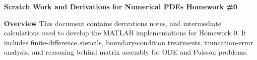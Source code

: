 \documentclass[11pt]{article}
\begin{document}
\begin{center}
    \textbf{Scratch Work and Derivations for Numerical PDEs Homework \#0}
\end{center}
\textbf{Overview} This document contains derivations notes, and intermediate calculations used to develop the MATLAB implementations for Homework 0. It includes finite-difference stencils, boundary-condition treatments, truncation-error analysis, and reasoning behind matrix assembly for ODE and Poisson problems.\\
\end{document}
